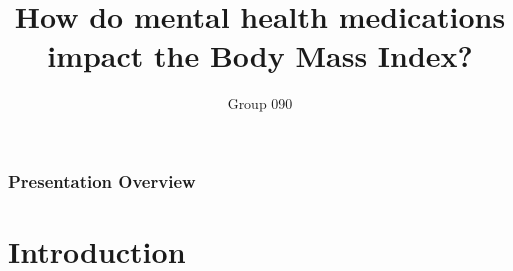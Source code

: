 \documentclass[
	11pt, %
]{beamer}
\title[Statistical Project]{How do mental health medications impact the Body Mass Index?} %
\author[Group 090]{Group 090} %
\institute[EC124]{EC124 \\ \bigskip
\today}%
\date[\today]{} %
\begin{document}

\begin{frame}
	\titlepage %
\end{frame}



\begin{frame}
	\frametitle{Presentation Overview} %
	
	\tableofcontents %
\end{frame}


\section{Introduction} %
\end{document}

